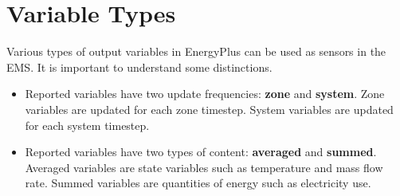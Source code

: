 \section{Variable Types}\label{variable-types}

Various types of output variables in EnergyPlus can be used as sensors in the EMS. It is important to understand some distinctions.

\begin{itemize}
\item
  Reported variables have two update frequencies: \textbf{zone} and \textbf{system}. Zone variables are updated for each zone timestep. System variables are updated for each system timestep.
\item
  Reported variables have two types of content: \textbf{averaged} and \textbf{summed}. Averaged variables are state variables such as temperature and mass flow rate. Summed variables are quantities of energy such as electricity use.
\end{itemize}

